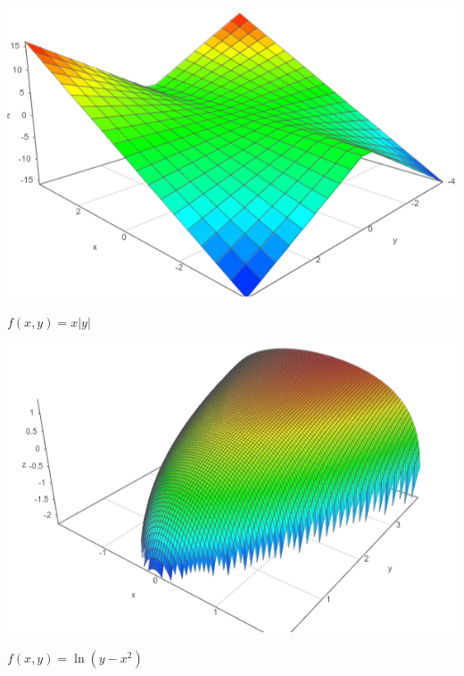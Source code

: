\documentclass[11pt,a4paper]{article}
\theoremstyle{exostyle}
\begin{document}
	\begin{center}
		\small
		\begin{minipage}{0.45\textwidth}
			\center	
			
			\includegraphics[scale=0.3]{figures-exercices/fpv-fiche1-exo3-fig3}	
			
			$f(x,y) = x |y|$
		\end{minipage}
		\begin{minipage}{0.45\textwidth}
			\center
				
			\includegraphics[scale=0.3]{figures-exercices/fpv-fiche1-exo3-fig4}
			
			$f(x,y) = \ln(y - x^2)$
		\end{minipage}	
	\end{center}
	
\end{document}
